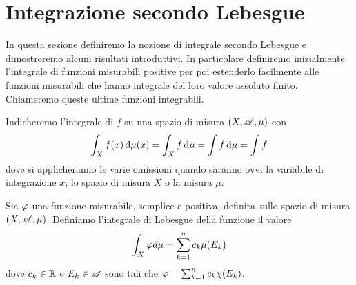 \section{Integrazione secondo Lebesgue}
In questa sezione definiremo la nozione di integrale secondo Lebesgue e dimostreremo alcuni risultati introduttivi. In particolare definiremo inizialmente l'integrale di funzioni misurabili positive per poi estenderlo facilmente alle funzioni misurabili che hanno integrale del loro valore assoluto finito. Chiameremo queste ultime funzioni integrabili.

\begin{remark}
	Indicheremo l'integrale di $f$ su una spazio di misura $(X,\mathscr A,\mu)$ con 
	\begin{equation*}
		\int_X f(x) \,\mathrm d \mu(x)=\int_X f \,\mathrm d \mu=\int f \,\mathrm d \mu=\int f
	\end{equation*}
	dove si applicheranno le varie omissioni quando saranno ovvi la variabile di integrazione $x$, lo spazio di misura $X$ o la misura $\mu$.
\end{remark}

\begin{definition}\label{def:IntegraleSemplici}
	Sia $\varphi$ una funzione misurabile, semplice e positiva, definita sullo spazio di misura $(X,\mathscr A,\mu)$. Definiamo l'integrale di Lebesgue della funzione il valore
	\begin{equation*}
		\int_X \varphi d \mu = \sum_{k=1}^n c_k\mu(E_k)
	\end{equation*}
	dove $c_k\in \mathbb R$ e $E_k \in \mathscr A$ sono tali che $\varphi=\sum_{k=1}^nc_k\chi(E_k)$.
\end{definition}

